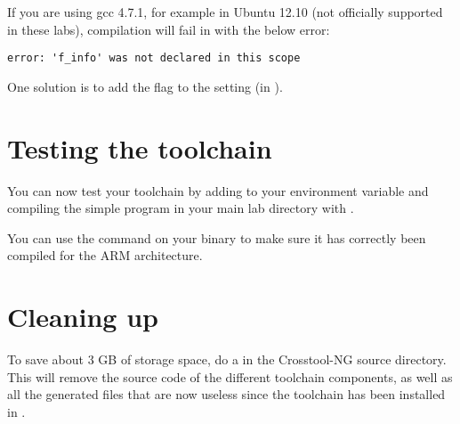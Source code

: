 If you are using gcc 4.7.1, for example in Ubuntu 12.10 (not officially
supported in these labs), compilation will fail in  with
the below error:

\begin{verbatim}
error: 'f_info' was not declared in this scope
\end{verbatim}

One solution is to add the  flag to the
 setting (in ). 

\section{Testing the toolchain}

You can now test your toolchain by adding
 to your
 environment variable and compiling the simple
 program in your main lab directory with
.

You can use the  command on your binary to make sure it has
correctly been compiled for the ARM architecture.

\section{Cleaning up}

To save about 3 GB of storage space, do a  in the
Crosstool-NG source directory. This will remove the source code of the
different toolchain components, as well as all the generated files
that are now useless since the toolchain has been installed in
.

